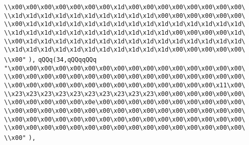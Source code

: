 \verb|\\x00\x00\x00\x00\x00\x00\x00\x1d\x00\x00\x00\x00\x00\x00\x00\x00\|\newline
\verb|\\x1d\x1d\x1d\x1d\x1d\x1d\x1d\x1d\x1d\x1d\x00\x00\x00\x00\x00\x00\|\newline
\verb|\\x00\x1d\x1d\x1d\x1d\x1d\x1d\x1d\x1d\x1d\x1d\x1d\x1d\x1d\x1d\x1d\|\newline
\verb|\\x1d\x1d\x1d\x1d\x1d\x1d\x1d\x1d\x1d\x1d\x1d\x00\x00\x00\x00\x1d\|\newline
\verb|\\x00\x1d\x1d\x1d\x1d\x1d\x1d\x1d\x1d\x1d\x1d\x1d\x1d\x1d\x1d\x1d\|\newline
\verb|\\x1d\x1d\x1d\x1d\x1d\x1d\x1d\x1d\x1d\x1d\x1d\x00\x00\x00\x00\x00\|\newline
\verb|\\x00"|\newline
\verb|),|\newline
\verb|qQQq(34,qQQqqQQq|\newline
\verb|"\x00\x00\x00\x00\x00\x00\x00\x00\x00\x00\x00\x00\x00\x00\x00\x00\|\newline
\verb|\\x00\x00\x00\x00\x00\x00\x00\x00\x00\x00\x00\x00\x00\x00\x00\x00\|\newline
\verb|\\x00\x00\x00\x00\x00\x00\x00\x00\x00\x00\x00\x00\x00\x00\x11\x00\|\newline
\verb|\\x23\x23\x23\x23\x23\x23\x23\x23\x23\x23\x00\x00\x00\x00\x00\x00\|\newline
\verb|\\x00\x00\x00\x00\x00\x0e\x00\x00\x00\x00\x00\x00\x00\x00\x00\x00\|\newline
\verb|\\x00\x00\x00\x00\x00\x00\x00\x00\x00\x00\x00\x00\x00\x00\x00\x00\|\newline
\verb|\\x00\x00\x00\x00\x00\x00\x00\x00\x00\x00\x00\x00\x00\x00\x00\x00\|\newline
\verb|\\x00\x00\x00\x00\x00\x00\x00\x00\x00\x00\x00\x00\x00\x00\x00\x00\|\newline
\verb|\\x00"|\newline
\verb|),|\newline
